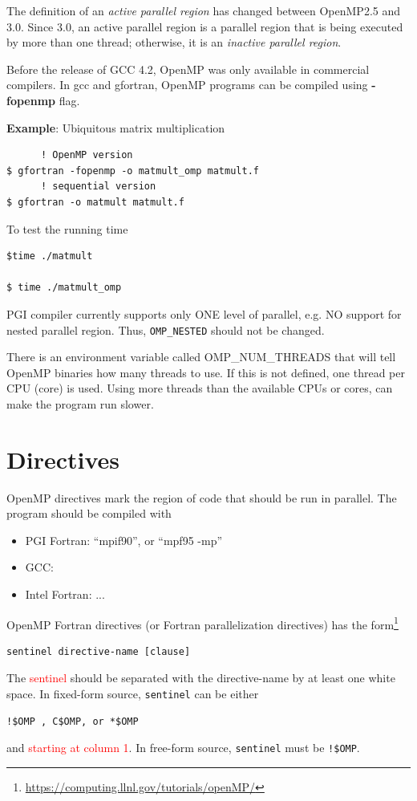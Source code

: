 The definition of an {\it active parallel region} has changed between
OpenMP2.5 and 3.0. Since 3.0, an active parallel region is a parallel
region that is being executed by more than one thread; otherwise, it
is an {\it inactive parallel region}. 

Before the release of GCC 4.2, OpenMP was only available in commercial
compilers. In gcc and gfortran, OpenMP programs can be compiled using
{\bf -fopenmp} flag.

{\bf Example}: Ubiquitous matrix multiplication

\begin{verbatim}
      ! OpenMP version
$ gfortran -fopenmp -o matmult_omp matmult.f
      ! sequential version
$ gfortran -o matmult matmult.f    
\end{verbatim}
To test the running time
\begin{verbatim}
$time ./matmult

$ time ./matmult_omp
\end{verbatim}

PGI compiler currently supports only ONE level of parallel, e.g. NO
support for nested parallel region. Thus, \verb!OMP_NESTED! should not
be changed.

There is an environment variable called OMP\_NUM\_THREADS that will tell
OpenMP binaries how many threads to use. If this is not defined, one
thread per CPU (core) is used. Using more threads than the available
CPUs or cores, can make the program run slower.

\section{Directives}
\label{sec:directives}

OpenMP directives mark the region of code that should be run in
parallel. The program should be compiled with
\begin{itemize}
\item PGI Fortran: ``mpif90'', or ``mpf95 -mp''
\item GCC:
\item Intel Fortran: ...
\end{itemize}

OpenMP Fortran directives (or Fortran parallelization directives) has
the form\footnote{\url{https://computing.llnl.gov/tutorials/openMP/}}
\begin{verbatim}
sentinel directive-name [clause]
\end{verbatim}
The \textcolor{red}{sentinel} should be separated with the
directive-name by at least one white space.  In fixed-form source,
\verb!sentinel! can be either
\begin{verbatim}
!$OMP , C$OMP, or *$OMP
\end{verbatim}
and \textcolor{red}{starting at column 1}. In free-form source,
\verb!sentinel! must be \verb.!$OMP..

